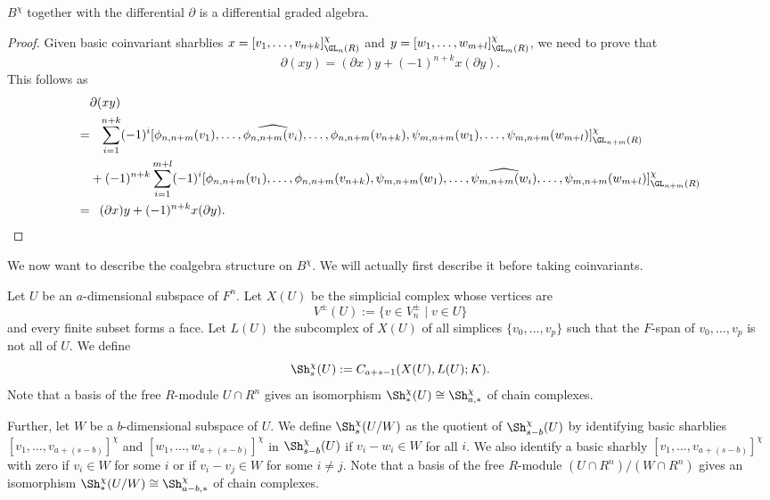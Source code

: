 \begin{lemma}
$B^\chi$ together with the differential $\partial$ is a differential graded algebra.
\end{lemma}

\begin{proof}
Given basic coinvariant sharblies $x = [v_1, \dots, v_{n+k}]^\chi_{\GL_n(R)}$ and $y =  [w_1, \dots, w_{m+l}]^\chi_{\GL_m(R)}$, we need to prove that
\[ \partial(xy) = (\partial x)y + (-1)^{n+k} x(\partial y).\]
This follows as
\begin{align*} &\partial(xy) \\= &\phantom{+}\sum_{i=1}^{n+k}  
(-1)^i
[ \phi_{n,n+m}(v_1), \dots,\widehat{ \phi_{n,n+m}(v_i)},\dots, \phi_{n,n+m}(v_{n+k}), \psi_{m,n+m}(w_1), \dots, \psi_{m,n+m}(w_{m+l})]^\chi_{\GL_{n+m}(R)} \\
&+ (-1)^{n+k} \sum_{i=1}^{m+l}  
(-1)^i
[ \phi_{n,n+m}(v_1),\dots, \phi_{n,n+m}(v_{n+k}), \psi_{m,n+m}(w_1), \dots,\widehat{ \psi_{m,n+m}(w_i)},\dots, \psi_{m,n+m}(w_{m+l})]^\chi_{\GL_{n+m}(R)}\\
= & \phantom{+}(\partial x)y + (-1)^{n+k} x(\partial y)\qedhere.
\end{align*}
\end{proof}

We now want to describe the coalgebra structure on $B^\chi$. We will actually first describe it before taking coinvariants. 

\begin{definition}
Let $U$ be an $a$-dimensional subspace of $F^n$. Let $X(U)$ be the simplicial complex whose vertices are 
\[ V^\pm(U) := \{ v \in V^\pm_n \mid v \in U\}\]
and every finite subset forms a face. Let $L(U)$ the subcomplex of $X(U)$ of all simplices $\{v_0, \dots, v_p\}$ such that the $F$-span of $v_0, \dots, v_p$ is not all of $U$.
We define 
\[\Sh^\chi_s(U):= C_{a+s-1}(X(U), L(U); K).\]
Note that a basis of the free $R$-module $U\cap R^n$ gives an isomorphism $\Sh^\chi_*(U) \cong \Sh^\chi_{a,*}$ of chain complexes.

Further, let $W$ be a $b$-dimensional subspace of $U$.
We define $\Sh^\chi_s(U/W)$ as the quotient of $\Sh^\chi_{s-b}(U)$ by identifying basic sharblies $[v_1, \dots, v_{a+(s-b)}]^\chi$ and $[w_1, \dots, w_{a+(s-b)}]^\chi$ in  $\Sh^\chi_{s-b}(U)$ if $v_i -w_i \in W$ for all $i$. We also identify a basic sharbly $[v_1, \dots, v_{a+(s-b)}]^\chi$ with zero if $v_i \in W$ for some $i$ or if $v_i-v_j \in W$ for some $i\neq j$. Note that a basis of the free $R$-module $(U\cap R^n)/(W\cap R^n)$ gives an isomorphism $\Sh^\chi_*(U/W) \cong \Sh^\chi_{a-b,*}$ of chain complexes.
\end{definition}


